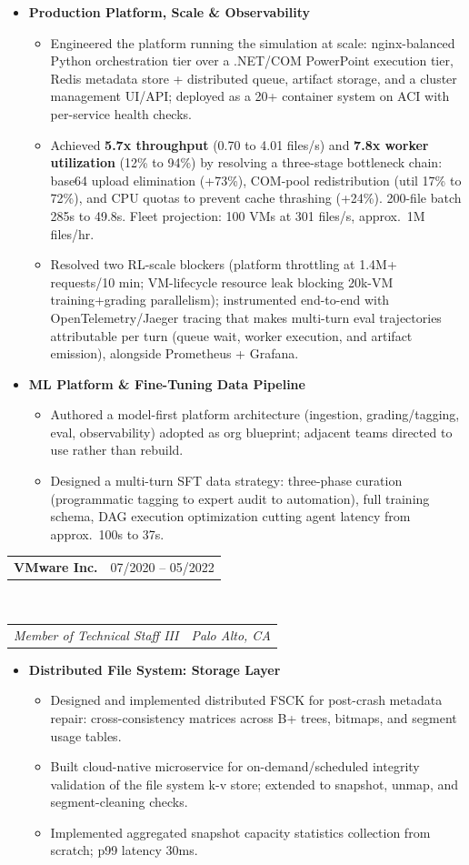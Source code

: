 \documentclass[letterpaper,11pt]{article}
\makeatletter
\newcommand{\resumeSubListItemWithoutDesc}[1]{
  \vspace{2pt}\item\small{{ #1 \vspace{-2pt}}}
}
\newcommand{\resumeItemSubListHeading}[1]{
  \vspace{1pt}\item\small{\textbf{#1}\vspace{-1pt}}
}
\newcommand{\resumeSubheading}[2]{
  \vspace{-1pt}\item[]
    \begin{tabular*}{0.97\textwidth}[t]{l@{\extracolsep{\fill}}r}
      \textbf{#1} & #2 \\
    \end{tabular*}\vspace{-5pt}
}
\newcommand{\resumeItemListHeading}[2]{
    \vspace{3pt}
    \begin{tabular*}{0.97\textwidth}[t]{l@{\extracolsep{\fill}}r}
      \textit{#1} & \textit{\small #2} \\
    \end{tabular*}\vspace{1pt}
}
\newcommand{\resumeItemListStart}{\begin{itemize}}
\newcommand{\resumeItemSubListStart}{\begin{itemize}}
\newcommand{\resumeItemSubListEnd}{\end{itemize}\vspace{-5pt}}
\newcommand{\resumeItemListEnd}{\end{itemize}\vspace{-5pt}}
\makeatother
\begin{document}
    \resumeItemListStart
      \resumeItemSubListHeading{Production Platform, Scale \& Observability}
        \resumeItemSubListStart
          \resumeSubListItemWithoutDesc{Engineered the platform running the simulation at scale: nginx-balanced Python orchestration tier over a .NET/COM PowerPoint execution tier, Redis metadata store + distributed queue, artifact storage, and a cluster management UI/API; deployed as a 20+ container system on ACI with per-service health checks.}
          \resumeSubListItemWithoutDesc{Achieved \textbf{5.7x throughput} (0.70 to 4.01 files/s) and \textbf{7.8x worker utilization} (12\% to 94\%) by resolving a three-stage bottleneck chain: base64 upload elimination (+73\%), COM-pool redistribution (util 17\% to 72\%), and CPU quotas to prevent cache thrashing (+24\%). 200-file batch 285s to 49.8s. Fleet projection: 100 VMs at 301 files/s, approx.\ 1M files/hr.}
          \resumeSubListItemWithoutDesc{Resolved two RL-scale blockers (platform throttling at 1.4M+ requests/10 min; VM-lifecycle resource leak blocking 20k-VM training+grading parallelism); instrumented end-to-end with OpenTelemetry/Jaeger tracing that makes multi-turn eval trajectories attributable per turn (queue wait, worker execution, and artifact emission), alongside Prometheus + Grafana.}
        \resumeItemSubListEnd
    \resumeItemListEnd

    \resumeItemListStart
      \resumeItemSubListHeading{ML Platform \& Fine-Tuning Data Pipeline}
        \resumeItemSubListStart
          \resumeSubListItemWithoutDesc{Authored a model-first platform architecture (ingestion, grading/tagging, eval, observability) adopted as org blueprint; adjacent teams directed to use rather than rebuild.}
          \resumeSubListItemWithoutDesc{Designed a multi-turn SFT data strategy: three-phase curation (programmatic tagging to expert audit to automation), full training schema, DAG execution optimization cutting agent latency from approx.\ 100s to 37s.}
        \resumeItemSubListEnd
    \resumeItemListEnd

    \resumeSubheading{VMware Inc.}{07/2020 -- 05/2022}\\
    \vspace*{4pt}
    \resumeItemListHeading{Member of Technical Staff III}{Palo Alto, CA}
    \resumeItemListStart
      \resumeItemSubListHeading{Distributed File System: Storage Layer}
        \resumeItemSubListStart
          \resumeSubListItemWithoutDesc{Designed and implemented distributed FSCK for post-crash metadata repair: cross-consistency matrices across B+ trees, bitmaps, and segment usage tables.}
          \resumeSubListItemWithoutDesc{Built cloud-native microservice for on-demand/scheduled integrity validation of the file system k-v store; extended to snapshot, unmap, and segment-cleaning checks.}
          \resumeSubListItemWithoutDesc{Implemented aggregated snapshot capacity statistics collection from scratch; p99 latency 30ms.}
        \resumeItemSubListEnd
    \resumeItemListEnd
\end{document}
